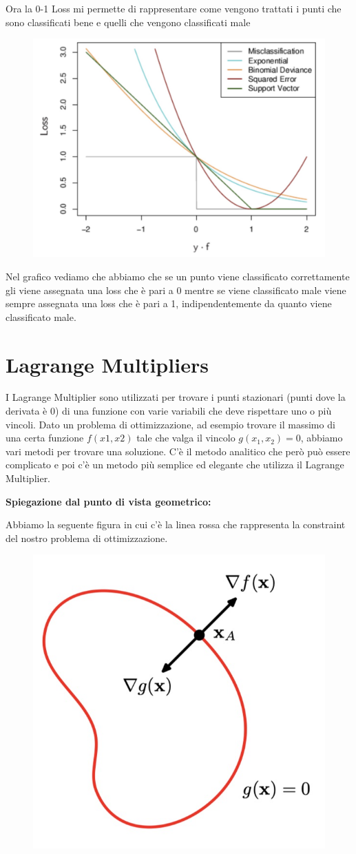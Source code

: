 \documentclass[14pt]{extreport}
\begin{document}
Ora la 0-1 Loss mi permette di rappresentare come vengono trattati i punti che sono classificati bene e quelli che vengono classificati male

\begin{figure}[H]
\centering
\includegraphics[width=0.5\linewidth]{331.jpeg}
\end{figure}

Nel grafico vediamo che abbiamo che se un punto viene classificato correttamente gli viene assegnata una loss che è pari a 0 mentre se viene
classificato male viene sempre assegnata una loss che è pari a 1, indipendentemente da quanto viene classificato male.


\section{Lagrange Multipliers}

I Lagrange Multiplier sono utilizzati per trovare i punti stazionari (punti dove la derivata è 0) di una funzione con varie variabili che deve
rispettare uno o più vincoli. Dato un problema di ottimizzazione, ad esempio trovare il massimo di una certa funzione $f(x1,x2)$ tale che valga il
vincolo $g(x_1, x_2) = 0$, abbiamo vari metodi per trovare una soluzione. C'è il metodo analitico che però può essere complicato e poi c'è un metodo
più semplice ed elegante che utilizza il Lagrange Multiplier.

\textbf{Spiegazione dal punto di vista geometrico:}

Abbiamo la seguente figura in cui c'è la linea rossa che rappresenta la constraint del nostro problema di ottimizzazione.

\begin{figure}[H]
\centering
\includegraphics[width=0.5\linewidth]{348.jpeg}
\end{figure}
\end{document}
